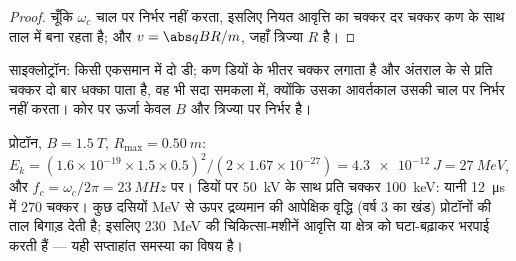 \begin{proof}
चूँकि $\omega_c$ चाल पर निर्भर नहीं करता, इसलिए नियत आवृत्ति का 
चक्कर दर चक्कर कण के साथ ताल में बना रहता है; और $v = \abs qBR/m$, जहाँ
त्रिज्या $R$ है।
\end{proof}

\begin{omfigure}

{\small साइक्लोट्रॉन: किसी एकसमान  में दो डी; कण डियों के
भीतर चक्कर लगाता है और अंतराल के  से प्रति चक्कर दो बार धक्का पाता
है, वह भी सदा समकला में, क्योंकि उसका आवर्तकाल उसकी चाल पर निर्भर नहीं
करता। कोर पर ऊर्जा केवल $B$ और त्रिज्या पर निर्भर है।}
\end{omfigure}

\begin{example}[अस्पताल का साइक्लोट्रॉन]\label{ex:b1:charged-particles:medical}
प्रोटॉन, $B = \qty{1.5}{T}$, $R_{\max} = \qty{0.50}{m}$: $E_k =
(1.6\times10^{-19} \times 1.5 \times 0.5)^2/(2 \times 1.67\times10^{-27}) =
\qty{4.3e-12}{J} = \qty{27}{MeV}$, और $f_c = \omega_c/2\pi = \qty{23}{MHz}$
पर। डियों पर \qty{50}{kV} के साथ प्रति चक्कर \qty{100}{keV}: यानी
\qty{12}{\micro s} में $270$ चक्कर। कुछ दसियों \unit{MeV} से ऊपर द्रव्यमान की
आपेक्षिक वृद्धि (वर्ष 3 का खंड) प्रोटॉनों की ताल बिगाड़ देती है; इसलिए
\qty{230}{MeV} की चिकित्सा-मशीनें आवृत्ति या क्षेत्र को घटा-बढ़ाकर भरपाई
करती हैं --- यही सप्ताहांत समस्या का विषय है।
\end{example}

